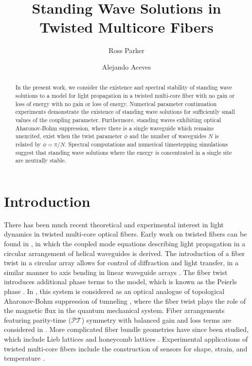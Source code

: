 \documentclass[reprint, amsmath,amssymb,aps]{revtex4-2}
\begin{document}
\title{Standing Wave Solutions in Twisted Multicore Fibers}

\author{Ross Parker}
\address{Department of Mathematics, Southern Methodist Univeristy, 
Dallas, TX 75275}

\author{Alejando Aceves}
\address{Department of Mathematics, Southern Methodist Univeristy, 
Dallas, TX 75275}

\begin{abstract}
In the present work, we consider the existence and spectral stability of standing wave solutions to a model for light propagation in a twisted multi-core fiber with no gain or loss of energy with no gain or loss of energy. Numerical parameter continuation experiments demonstrate the existence of standing wave solutions for sufficiently small values of the coupling parameter. Furthermore, standing waves exhibiting optical Aharonov-Bohm suppression, where there is a single waveguide which remains unexcited, exist when the twist parameter $\phi$ and the number of waveguides $N$ is related by $\phi = \pi/N$. Spectral computations and numerical timestepping simulations suggest that standing wave solutions where the energy is concentrated in a single site are neutrally stable. 
\end{abstract}

\maketitle

\section{Introduction}

There has been much recent theoretical and experimental interest in light dynamics in twisted multi-core optical fibers. Early work on twisted fibers can be found in \cite{Longhi2007,Longhi2007b}, in which the coupled mode equations describing light propagation in a circular arrangement of helical waveguides is derived. The introduction of a fiber twist in a circular array allows for control of diffraction and light transfer, in a similar manner to axis bending in linear waveguide arrays \cite{Longhi2005}. The fiber twist introduces additional phase terms to the model, which is known as the Peierls phase \cite{Longhi2007,Peierls1933}. In \cite{Ornigotti2007}, this system is considered as an optical analogue of topological Aharonov-Bohm suppression of tunneling \cite{Loss1992}, where the fiber twist plays the role of the magnetic flux in the quantum mechanical system. Fiber arrangements featuring parity-time ($\mathcal{PT}$) symmetry with balanced gain and loss terms are considered in \cite{Longhi2016,castro2016}. More complicated fiber bundle geometries have since been studied, which include Lieb lattices \cite{Marzuola2019bulk} and honeycomb lattices \cite{Ablowitz2014,Lumer2013}. Experimental applications of twisted multi-core fibers include the construction of sensors for shape, strain, and temperature \cite{Gannot2014,Westbrook2017}. 
\end{document}
